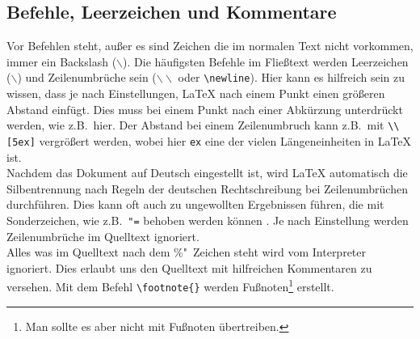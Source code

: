 \subsection{Befehle, Leerzeichen und Kommentare}
\label{subsec:TextBefehle}
Vor Befehlen steht, außer es sind Zeichen die im normalen Text nicht vorkommen, immer ein Backslash ($\backslash$). Die häufigsten Befehle im Fließtext werden Leerzeichen ($\backslash$) und Zeilenumbrüche sein ($\backslash\backslash$ oder \verb"\newline"). Hier kann es hilfreich sein zu wissen, dass je nach Einstellungen, \LaTeX{} nach einem Punkt einen größeren Abstand einfügt. Dies muss bei einem Punkt nach einer Abkürzung unterdrückt werden, wie z.B.\ hier. Der Abstand bei einem Zeilenumbruch kann z.B.\ mit \verb"\\[5ex]" vergrößert werden, wobei hier \verb"ex" eine der vielen Längeneinheiten in \LaTeX{} ist.\\
Nachdem das Dokument auf Deutsch eingestellt ist, wird \LaTeX{} automatisch die Silbentrennung nach Regeln der deutschen Rechtschreibung bei Zeilenumbrüchen durchführen. Dies kann oft auch zu ungewollten Ergebnissen führen, die mit Sonderzeichen, wie z.B.\ \verb+"=+ behoben werden können \cite{Silbentrennung}.
Je nach Einstellung werden Zeilenumbrüche im Quelltext ignoriert.\\
Alles was im Quelltext nach dem \%"~Zeichen steht wird vom Interpreter ignoriert. Dies erlaubt uns den Quelltext mit hilfreichen Kommentaren zu versehen. %
Mit dem Befehl \verb"\footnote{}" werden Fußnoten\footnote{Man sollte es aber nicht mit Fußnoten übertreiben.} erstellt.
